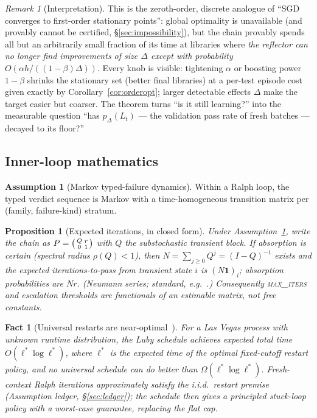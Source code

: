 \documentclass[11pt]{article}
\theoremstyle{plain}
\newtheorem{proposition}[theorem]{Proposition}
\newtheorem{fact}[theorem]{Fact} %
\theoremstyle{definition}
\newtheorem{assumption}[theorem]{Assumption}
\theoremstyle{remark}
\newtheorem{remark}[theorem]{Remark}
\newcommand{\one}{\mathbf{1}}
\begin{document}
\begin{remark}[Interpretation]
This is the zeroth-order, discrete analogue of ``SGD converges to first-order
stationary points'': global optimality is unavailable (and provably cannot be
certified, \S\ref{sec:impossibility}), but the chain provably spends all but
an arbitrarily small fraction of its time at libraries where
\emph{the reflector can no longer find improvements of size $\Delta$ except
with probability $O(\alpha h / ((1-\beta)\Delta))$}. Every knob is visible:
tightening $\alpha$ or boosting power $1-\beta$ shrinks the stationary set
(better final libraries) at a per-test episode cost given exactly by
Corollary~\ref{cor:orderopt}; larger detectable effects $\Delta$ make the
target easier but coarser. The theorem turns ``is it still learning?'' into
the measurable question ``has $p_\Delta(L_t)$ --- the validation pass rate of
fresh batches --- decayed to its floor?''
\end{remark}

\subsection{Inner-loop mathematics}

\begin{assumption}[Markov typed-failure dynamics]\label{asm:markov}
Within a Ralph loop, the typed verdict sequence is Markov with a
time-homogeneous transition matrix per (family, failure-kind) stratum.
\end{assumption}

\begin{proposition}[Expected iterations, in closed form]\label{prop:absorb}
Under Assumption~\ref{asm:markov}, write the chain as
$P = \begin{psmallmatrix} Q & r \\ 0 & 1 \end{psmallmatrix}$ with $Q$ the
substochastic transient block. If absorption is certain (spectral radius
$\rho(Q) < 1$), then $N = \sum_{j \ge 0} Q^j = (I - Q)^{-1}$ exists and the
expected iterations-to-pass from transient state $i$ is $(N \one)_i$;
absorption probabilities are $N r$. \textup{(Neumann series; standard, e.g.\
\cite{kemenysnell}.)} Consequently \textsc{max\_iters} and escalation
thresholds are functionals of an estimable matrix, not free constants.
\end{proposition}

\begin{fact}[Universal restarts are near-optimal~\cite{luby93}]\label{fact:luby}
For a Las Vegas process with unknown runtime distribution, the Luby schedule
achieves expected total time $O(\ell^\ast \log \ell^\ast)$, where $\ell^\ast$
is the expected time of the optimal fixed-cutoff restart policy, and no
universal schedule can do better than $\Omega(\ell^\ast \log \ell^\ast)$.
Fresh-context Ralph iterations approximately satisfy the i.i.d.\ restart
premise (Assumption ledger, \S\ref{sec:ledger}); the schedule then gives a
principled stuck-loop policy with a worst-case guarantee, replacing the flat
cap.
\end{fact}
\end{document}
